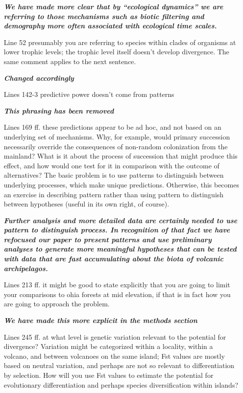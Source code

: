 \documentclass[12pt]{article}
\begin{document}
\begin{itemize}
  \textit{\textbf{We have made more clear that by ``ecological
      dynamics'' we are referring to those mechanisms such as biotic
      filtering and demography more often associated with ecological
      time scales.}}
%
\item[Line 52] presumably you are referring to species within clades
  of organisms at lower trophic levels; the trophic level itself
  doesn't develop divergence. The same comment applies to the next
  sentence.

\textit{\textbf{Changed accordingly}}
%
\item[Lines 142-3] predictive power doesn't come from patterns

\textit{\textbf{This phrasing has been removed}}
%
\item[Lines 169 ff.] these predictions appear to be ad hoc, and not based on
an underlying set of mechanisms. Why, for example, would primary
succession necessarily override the consequences of non-random
colonization from the mainland? What is it about the process of
succession that might produce this effect, and how would one test for
it in comparison with the outcome of alternatives? The basic problem
is to use patterns to distinguish between underlying processes, which
make unique predictions. Otherwise, this becomes an exercise in
describing pattern rather than using pattern to distinguish between
hypotheses (useful in its own right, of course).

\textit{\textbf{Further analysis and more detailed data are certainly
    needed to use pattern to distinguish process. In recognition of
    that fact we have refocused our paper to present patterns and use
    preliminary analyses to generate more meaningful hypotheses that
    can be tested with data that are fast accumulating about the biota
    of volcanic archipelagos.}}
%
\item[Lines 213 ff.] it might be good to state explicitly that you
  are going to limit your comparisons to ohia forests at mid
  elevation, if that is in fact how you are going to approach the
  problem.

  \textit{\textbf{We have made this more explicit in the methods
      section}}
%
\item[Lines 245 ff.] at what level is genetic variation relevant to
  the potential for divergence? Variation might be categorized within
  a locality, within a volcano, and between volcanoes on the same
  island; Fst values are mostly based on neutral variation, and
  perhaps are not so relevant to differentiation by selection. How
  will you use Fst values to estimate the potential for evolutionary
  differentiation and perhaps species diversification within islands?


\end{itemize}
\end{document}
